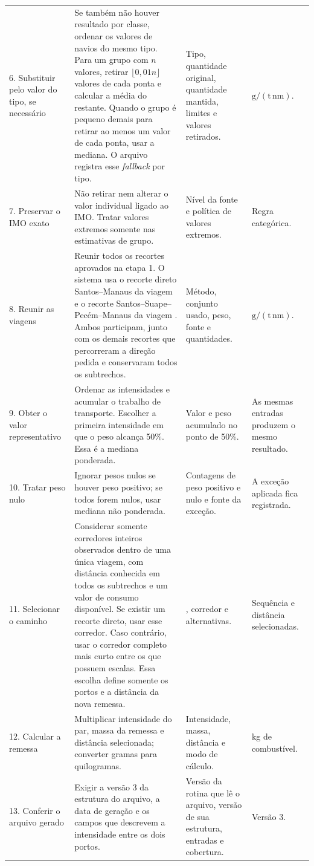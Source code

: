 \begin{longtable}{L{0.22\textwidth}L{0.29\textwidth}L{0.25\textwidth}L{0.16\textwidth}}
6. Substituir pelo valor do tipo, se necessário & Se também não houver resultado por classe, ordenar os valores de navios do mesmo tipo. Para um grupo com \(n\) valores, retirar \(\lfloor0{,}01n\rfloor\) valores de cada ponta e calcular a média do restante. Quando o grupo é pequeno demais para retirar ao menos um valor de cada ponta, usar a mediana. O arquivo registra esse \emph{fallback} por tipo. & Tipo, quantidade original, quantidade mantida, limites e valores retirados. & \(\mathrm{g/(t\,nm)}\).\\
7. Preservar o IMO exato & Não retirar nem alterar o valor individual ligado ao IMO. Tratar valores extremos somente nas estimativas de grupo. & Nível da fonte e política de valores extremos. & Regra categórica.\\
8. Reunir as viagens & Reunir todos os recortes aprovados na etapa 1. O sistema usa o recorte direto Santos--Manaus da viagem  e o recorte Santos--Suape--Pecém--Manaus da viagem . Ambos participam, junto com os demais recortes que percorreram a direção pedida e conservaram todos os subtrechos. & Método, conjunto usado, peso, fonte e quantidades. & \(\mathrm{g/(t\,nm)}\).\\
9. Obter o valor representativo & Ordenar as intensidades e acumular o trabalho de transporte. Escolher a primeira intensidade em que o peso alcança 50\%. Essa é a mediana ponderada. & Valor e peso acumulado no ponto de 50\%. & As mesmas entradas produzem o mesmo resultado.\\
10. Tratar peso nulo & Ignorar pesos nulos se houver peso positivo; se todos forem nulos, usar mediana não ponderada. & Contagens de peso positivo e nulo e fonte da exceção. & A exceção aplicada fica registrada.\\
11. Selecionar o caminho & Considerar somente corredores inteiros observados dentro de uma única viagem, com distância conhecida em todos os subtrechos e um valor de consumo disponível. Se existir um recorte direto, usar esse corredor. Caso contrário, usar o corredor completo mais curto entre os que possuem escalas. Essa escolha define somente os portos e a distância da nova remessa. & , corredor e alternativas. & Sequência e distância selecionadas.\\
12. Calcular a remessa & Multiplicar intensidade do par, massa da remessa e distância selecionada; converter gramas para quilogramas. & Intensidade, massa, distância e modo de cálculo. & kg de combustível.\\
13. Conferir o arquivo gerado & Exigir a versão 3 da estrutura do arquivo, a data de geração e os campos que descrevem a intensidade entre os dois portos. & Versão da rotina que lê o arquivo, versão de sua estrutura, entradas e cobertura. & Versão 3.\\
\bottomrule
\end{longtable}
\endgroup

